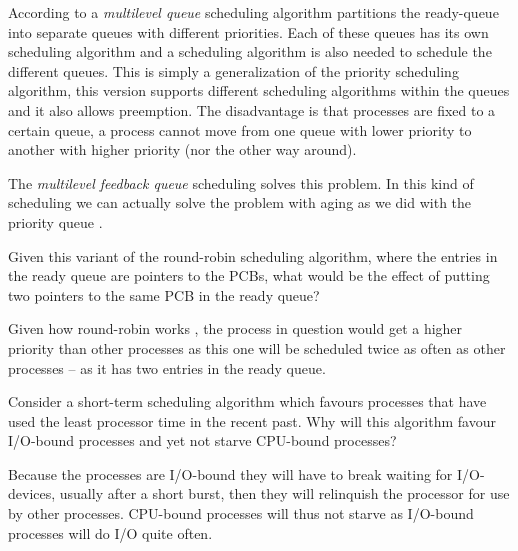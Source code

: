 \documentclass[a4paper,nocourse]{miunasgn}
\begin{document}
\begin{questions}
\begin{solution}
		According to \citet[pp. 196--197]{Silberschatz2009osc} a \emph{multilevel 
		queue} scheduling algorithm partitions the ready-queue into separate queues 
		with different priorities.
		Each of these queues has its own scheduling algorithm and a scheduling 
		algorithm is also needed to schedule the different queues.
		This is simply a generalization of the priority scheduling algorithm, this 
		version supports different scheduling algorithms within the queues and it 
		also allows preemption.
		The disadvantage is that processes are fixed to a certain queue, a process 
		cannot move from one queue with lower priority to another with higher 
		priority (nor the other way around).

		The \emph{multilevel feedback queue} scheduling solves this problem.
		In this kind of scheduling we can actually solve the problem with aging as 
		we did with the priority queue \citep[cf.][p. 198]{Silberschatz2009osc}.
	\end{solution}

	\question\label{q:roundrobin}
	Given this variant of the round-robin scheduling algorithm, where the entries 
	in the ready queue are pointers to the PCBs, what would be the effect of 
	putting two pointers to the same PCB in the ready queue?
	\begin{solution}
		Given how round-robin works \citep[pp. 194-195]{Silberschatz2009osc}, the 
		process in question would get a higher priority than other processes as 
		this one will be scheduled twice as often as other processes -- as it has 
		two entries in the ready queue.
	\end{solution}

	\question\label{q:favouringalg}
	Consider a short-term scheduling algorithm which favours processes that have 
	used the least processor time in the recent past.
	Why will this algorithm favour I/O-bound processes and yet not starve 
	CPU-bound processes?
	\begin{solution}
		Because the processes are I/O-bound they will have to break waiting for 
		I/O-devices, usually after a short burst, then they will relinquish the 
		processor for use by other processes.
		CPU-bound processes will thus not starve as I/O-bound processes will do I/O 
		quite often.
	\end{solution}


\end{questions}
\end{document}
